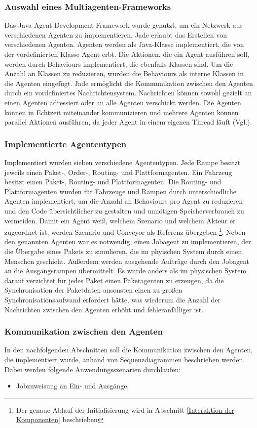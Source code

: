 \subsubsection{Auswahl eines Multiagenten-Frameworks}
Das Java Agent Development Framework wurde genutzt, um ein Netzwerk aus verschiedenen Agenten zu implementieren. Jade erlaubt das Erstellen von verschiedenen Agenten. Agenten werden als Java-Klasse implementiert, die von der vordefinierten Klasse Agent erbt. Die Aktionen, die ein Agent ausführen soll, werden durch Behaviours implementiert, die ebenfalls Klassen sind. Um die Anzahl an Klassen zu reduzieren, wurden die Behaviours als interne Klassen in die Agenten eingefügt. Jade ermöglicht die Kommunikation zwischen den Agenten durch ein vordefiniertes Nachrichtensystem. Nachrichten können sowohl gezielt an einen Agenten adressiert oder an alle Agenten verschickt werden. Die Agenten können in Echtzeit miteinander kommunizieren und mehrere Agenten können parallel Aktionen ausführen, da jeder Agent in einem eigenen Thread läuft (Vgl.\cite{jadetwo}). 
\subsubsection{Implementierte Agententypen}
Implementiert wurden sieben verschiedene Agententypen. Jede Rampe besitzt jeweils einen Paket-, Order-, Routing- und Plattformagenten. Ein Fahrzeug besitzt einen Paket-, Routing- und Plattformagenten. Die Routing- und Plattformagenten wurden für Fahrzeuge und Rampen durch unterschiedliche Agenten implementiert, um die Anzahl an Behaviours pro Agent zu reduzieren und den Code übersichtlicher zu gestalten und unnötigen Speicherverbrauch zu vermeiden. Damit ein Agent weiß, welchem Szenario und welchem Akteur er zugeordnet ist, werden Szenario und Conveyor als Referenz übergeben \footnote{Der genaue Ablauf der Initialisierung wird in Abschnitt \ref{Interaktion der Komponenten} beschrieben}. Neben den genannten Agenten war es notwendig, einen Jobagent zu implementieren, der die Übergabe eines Pakets zu simulieren, die im phyischen System durch einen Menschen geschieht. Außerdem werden ausgehende Aufträge durch den Jobagent an die Ausgangsrampen übermittelt. Es wurde anders als im physischen System darauf verzichtet für jedes Paket einen Paketagenten zu erzeugen, da die Synchronisation der Paketdaten ansonsten einen zu großen Synchronisationsaufwand erfordert hätte, was wiederum die Anzahl der Nachrichten zwischen den Agenten erhöht und fehleranfälliger ist.
\subsubsection{Kommunikation zwischen den Agenten}
In den nachfolgenden Abschnitten soll die Kommunikation zwischen den Agenten, die implementiert wurde, anhand von Sequenzdiagrammen beschrieben werden. Dabei werden folgende Anwendungsszenarien durchlaufen:
\begin{itemize}
\item Jobzuweisung an Ein- und Ausgänge.
\end{itemize}

